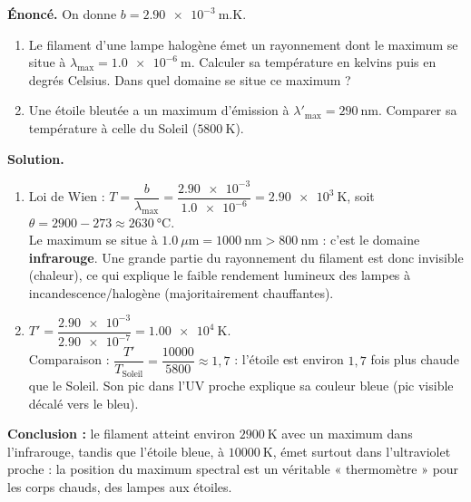\documentclass[11pt]{article}
\begin{document}
\begin{exoresolu}
\textbf{Énoncé.} On donne $b = \num{2,90e-3}~\text{m.K}$.
\begin{enumerate}
\item Le filament d'une lampe halogène émet un rayonnement dont le maximum se situe à $\lambda_{\max} = \num{1,0e-6}~\text{m}$. Calculer sa température en kelvins puis en degrés Celsius. Dans quel domaine se situe ce maximum ?
\item Une étoile bleutée a un maximum d'émission à $\lambda'_{\max} = 290~\text{nm}$. Comparer sa température à celle du Soleil ($\num{5800}~\text{K}$).
\end{enumerate}
\tcblower
\textbf{Solution.}
\begin{enumerate}
\item Loi de Wien : $T = \dfrac{b}{\lambda_{\max}} = \dfrac{\num{2,90e-3}}{\num{1,0e-6}} = \num{2,90e3}~\text{K}$, soit $\theta = 2900 - 273 \approx \num{2630}~°\text{C}$.\\
Le maximum se situe à $\num{1,0}~\mu\text{m} = 1000~\text{nm} > 800~\text{nm}$ : c'est le domaine \textbf{infrarouge}. Une grande partie du rayonnement du filament est donc invisible (chaleur), ce qui explique le faible rendement lumineux des lampes à incandescence/halogène (majoritairement chauffantes).
\item $T' = \dfrac{\num{2,90e-3}}{\num{2,90e-7}} = \num{1,00e4}~\text{K}$.\\
Comparaison : $\dfrac{T'}{T_{\text{Soleil}}} = \dfrac{\num{10000}}{\num{5800}} \approx 1,7$ : l'étoile est environ $1,7$ fois plus chaude que le Soleil. Son pic dans l'UV proche explique sa couleur bleue (pic visible décalé vers le bleu).
\end{enumerate}
\textbf{Conclusion :} le filament atteint environ $\num{2900}~\text{K}$ avec un maximum dans l'infrarouge, tandis que l'étoile bleue, à $\num{10000}~\text{K}$, émet surtout dans l'ultraviolet proche : la position du maximum spectral est un véritable « thermomètre » pour les corps chauds, des lampes aux étoiles.
\end{exoresolu}
\end{document}
